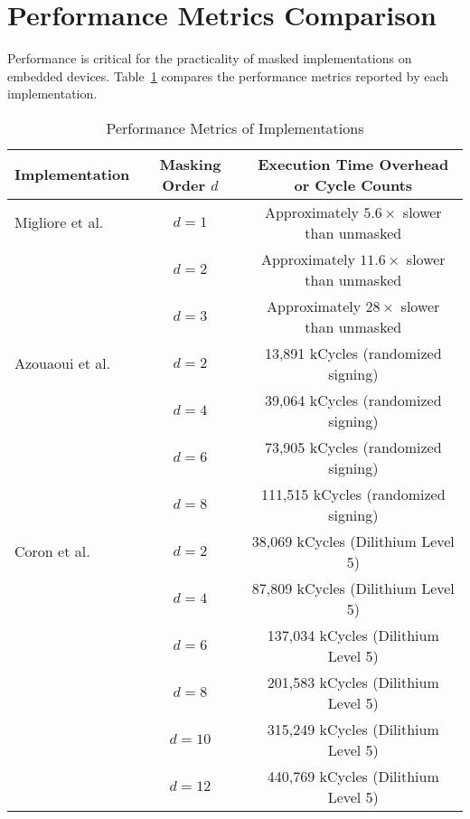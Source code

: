 \section{Performance Metrics Comparison}

Performance is critical for the practicality of masked implementations on embedded devices. Table~\ref{tab:performance_metrics} compares the performance metrics reported by each implementation.

\begin{table}[h]
    \centering
    \renewcommand{\arraystretch}{1.2}
    \caption{Performance Metrics of Implementations}
    \begin{tabular}{l | c | c}
        \toprule
        \textbf{Implementation}           & \textbf{Masking Order $d$} & \textbf{Execution Time Overhead or Cycle Counts} \\
        \midrule
        Migliore et al.~\cite{Migliore19} & $d=1$                      & Approximately $5.6\times$ slower than unmasked   \\
                                          & $d=2$                      & Approximately $11.6\times$ slower than unmasked  \\
                                          & $d=3$                      & Approximately $28\times$ slower than unmasked    \\
        \midrule
        Azouaoui et al.~\cite{Azouaoui22} & $d=2$                      & 13,891 kCycles (randomized signing)              \\
                                          & $d=4$                      & 39,064 kCycles (randomized signing)              \\
                                          & $d=6$                      & 73,905 kCycles (randomized signing)              \\
                                          & $d=8$                      & 111,515 kCycles (randomized signing)             \\
        \midrule
        Coron et al.~\cite{Coron23}       & $d=2$                      & 38,069 kCycles (Dilithium Level 5)               \\
                                          & $d=4$                      & 87,809 kCycles (Dilithium Level 5)               \\
                                          & $d=6$                      & 137,034 kCycles (Dilithium Level 5)              \\
                                          & $d=8$                      & 201,583 kCycles (Dilithium Level 5)              \\
                                          & $d=10$                     & 315,249 kCycles (Dilithium Level 5)              \\
                                          & $d=12$                     & 440,769 kCycles (Dilithium Level 5)              \\
        \bottomrule
    \end{tabular}
    \label{tab:performance_metrics}
\end{table}


